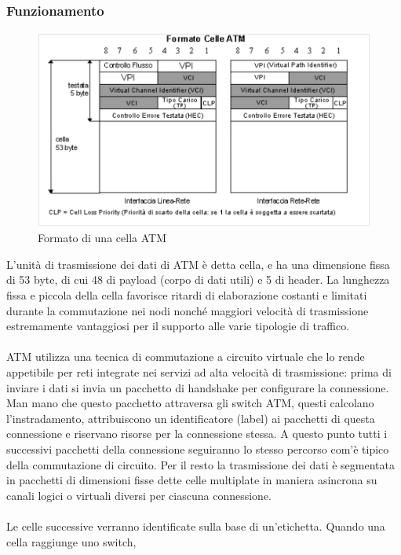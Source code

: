 \documentclass[8pt]{extarticle}
\begin{document}
\subsubsection{Funzionamento}
\begin{figure}[H]
    \center
    \includegraphics[scale=0.3]{images/ATM1.png}
    \caption{Formato di una cella ATM}\label{fig:1}
\end{figure}
\noindent
L'unità di trasmissione dei dati di ATM è detta cella, e ha una dimensione fissa di 53 byte, di cui 48 di 
payload (corpo di dati utili) e 5 di header. La lunghezza fissa e piccola della cella favorisce ritardi 
di elaborazione costanti e limitati durante la commutazione nei nodi nonché maggiori velocità di 
trasmissione estremamente vantaggiosi per il supporto alle varie tipologie di traffico.\\\\
ATM utilizza una tecnica di commutazione a circuito virtuale che lo rende appetibile per reti integrate 
nei servizi ad alta velocità di trasmissione: prima di inviare i dati si invia un pacchetto di handshake 
per configurare la connessione. Man mano che questo pacchetto attraversa gli switch ATM, questi calcolano 
l'instradamento, attribuiscono un identificatore (label) ai pacchetti di questa connessione e riservano 
risorse per la connessione stessa. A questo punto tutti i successivi pacchetti della connessione seguiranno 
lo stesso percorso com'è tipico della commutazione di circuito. Per il resto la trasmissione dei dati 
è segmentata in pacchetti di dimensioni fisse dette celle multiplate in maniera asincrona su canali logici 
o virtuali diversi per ciascuna connessione.\\\\
Le celle successive verranno identificate sulla base di un'etichetta. Quando una cella raggiunge uno switch, 
\end{document}
